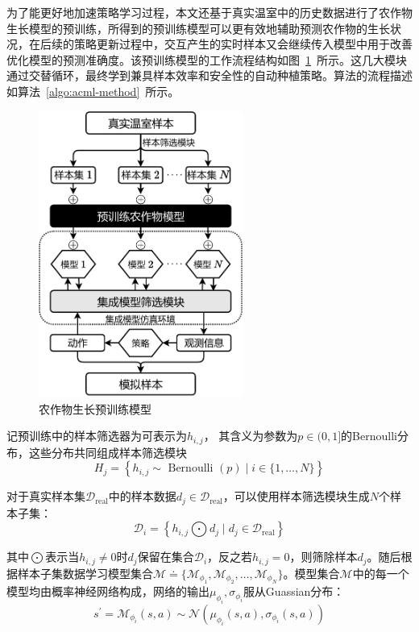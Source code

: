 为了能更好地加速策略学习过程，本文还基于真实温室中的历史数据进行了农作物生长模型的预训练，所得到的预训练模型可以更有效地辅助预测农作物的生长状况，在后续的策略更新过程中，交互产生的实时样本又会继续传入模型中用于改善优化模型的预测准确度。该预训练模型的工作流程结构如图~\ref{fig:pre-train-model}~所示。这几大模块通过交替循环，最终学到兼具样本效率和安全性的自动种植策略。算法的流程描述如算法~\ref{algo:acml-method}~所示。

\begin{figure}[ht]
\centering
\includegraphics[width=0.6\textwidth]{figures/pre-train-model.pdf}
\caption{农作物生长预训练模型}
\label{fig:pre-train-model}
\end{figure}

记预训练中的样本筛选器为可表示为$h_{i,j}$， 其含义为参数为$p\in(0, 1]$的Bernoulli分布，这些分布共同组成样本筛选模块
\begin{equation}
    H_{j}=\left\{h_{i,j} \sim \text { Bernoulli }(p) \mid i \in\{1, \ldots, N\}\right\}
\end{equation}

对于真实样本集$\mathcal{D}_{\text{real}}$中的样本数据$d_j\in\mathcal{D}_{\text{real}}$，可以使用样本筛选模块生成$N$个样本子集：
\begin{equation}
    \mathcal{D}_i=\left\{h_{i,j}\bigodot d_j\mid d_j\in\mathcal{D}_{\text{real}}\right\}
\end{equation}

其中$\bigodot$表示当$h_{i,j}\neq 0$时$d_j$保留在集合$\mathcal{D}_i$，反之若$h_{i,j}=0$，则筛除样本$d_j$。随后根据样本子集数据学习模型集合$\mathcal{M} \doteq \{\mathcal{M}_{\phi_1},\mathcal{M}_{\phi_2},\ldots,\mathcal{M}_{\phi_N}\}$。模型集合$\mathcal{M}$中的每一个模型均由概率神经网络构成，网络的输出$\mu_{\phi_i},\sigma_{\phi_i}$服从Guassian分布：
\begin{equation}
    s^\prime = \mathcal{M}_{\phi_i}(s,a) \sim \mathcal{N}(\mu_{\phi_i}(s,a),\sigma_{\phi_i}(s,a))
\end{equation}

